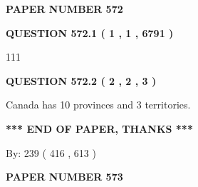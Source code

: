\documentclass[12pt]{article}
\begin{document}
   
   
   
 {\textbf{ \Large{ PAPER NUMBER  572  }}}
   
   
\vspace{0.2in}
   
   
   
   
   
   
 \vspace{0.2in}
 
 
 
 
   
   
  
\vspace{0.2in}
  
{\textbf{\Large{QUESTION
572.1 
 ( 1 , 1 , 6791 )
}}}
  
  
 
 
\noindent{}

111
 
 
  
\vspace{0.2in}
  
{\textbf{\Large{QUESTION
572.2 
 ( 2 , 2 , 3 )
}}}
  
  
 
 
\noindent{}
 
 
Canada has 10  provinces and 3 territories.
 
 
 
 
   
   
 \vspace{0.2in}
 
   
   
   
   
\vspace{1.0in} 
{\textbf{\large{ *** END OF PAPER, THANKS *** }}} 
   
   
\hspace{1.0in} By: 
 239 ( 416 ,  613 )
   
   
   
   
\newpage 
\setcounter{page}{ 
   573001 } 
   
   
   
   
 {\textbf{ \Large{ PAPER NUMBER  573  }}}
   
   
\vspace{0.2in}
   
\end{document}
